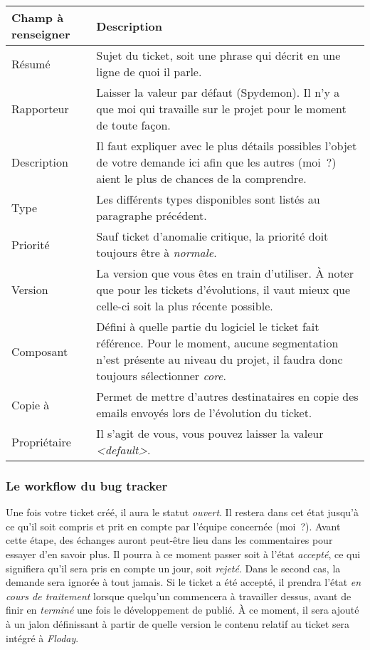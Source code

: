 \begin{longtable}{|p{3cm}|p{10cm}|}
	\hline
	Champ à renseigner & Description\\
	\hline
	Résumé & Sujet du ticket, soit une phrase qui décrit en une ligne de quoi il parle.\\
	Rapporteur & Laisser la valeur par défaut (Spydemon). Il n'y a que moi qui travaille sur le projet pour le moment de toute façon.\\
	Description & Il faut expliquer avec le plus détails possibles l'objet de votre demande ici afin que les autres (moi~?) aient le plus de chances de la comprendre.\\
	Type & Les différents types disponibles sont listés au paragraphe précédent.\\
	Priorité & Sauf ticket d'anomalie critique, la priorité doit toujours être à \emph{normale}.\\
	Version & La version que vous êtes en train d'utiliser. À noter que pour les tickets d'évolutions, il vaut mieux que celle-ci soit la plus récente possible.\\
	Composant & Défini à quelle partie du logiciel le ticket fait référence. Pour le moment, aucune segmentation n'est présente au niveau du projet, il faudra donc toujours sélectionner \emph{core}.\\
	Copie à & Permet de mettre d'autres destinataires en copie des emails envoyés lors de l'évolution du ticket.\\
	Propriétaire & Il s'agit de vous, vous pouvez laisser la valeur \emph{<default>}.\\
	\hline
\end{longtable}

\subsubsection{Le workflow du bug tracker}

Une fois votre ticket créé, il aura le statut \emph{ouvert}.
Il restera dans cet état jusqu'à ce qu'il soit compris et prit en compte par l'équipe concernée (moi~?).
Avant cette étape, des échanges auront peut-être lieu dans les commentaires pour essayer d'en savoir plus.
Il pourra à ce moment passer soit à l'état \emph{accepté}, ce qui signifiera qu'il sera pris en compte un jour, soit \emph{rejeté}.
Dans le second cas, la demande sera ignorée à tout jamais.
Si le ticket a été accepté, il prendra l'état \emph{en cours de traitement} lorsque quelqu'un commencera à travailler dessus, avant de finir en \emph{terminé} une fois le développement de publié.
À ce moment, il sera ajouté à un jalon définissant à partir de quelle version le contenu relatif au ticket sera intégré à \emph{Floday}.
